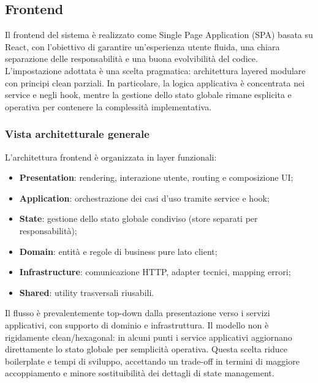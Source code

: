 \documentclass[a4paper,12pt]{article}
\begin{document}
        \subsection{Frontend}
            Il frontend del sistema è realizzato come Single Page Application (SPA) basata su React, con l'obiettivo di garantire un'esperienza utente fluida, una chiara separazione delle responsabilità e una buona evolvibilità del codice.  
            L'impostazione adottata è una scelta pragmatica: architettura layered modulare con principi clean parziali. In particolare, la logica applicativa è concentrata nei service e negli hook, mentre la gestione dello stato globale rimane esplicita e operativa per contenere la complessità implementativa.
            
            \subsubsection{Vista architetturale generale}
            L'architettura frontend è organizzata in layer funzionali:
            \begin{itemize}
                \item \textbf{Presentation}: rendering, interazione utente, routing e composizione UI;
                \item \textbf{Application}: orchestrazione dei casi d'uso tramite service e hook;
                \item \textbf{State}: gestione dello stato globale condiviso (store separati per responsabilità);
                \item \textbf{Domain}: entità e regole di business pure lato client;
                \item \textbf{Infrastructure}: comunicazione HTTP, adapter tecnici, mapping errori;
                \item \textbf{Shared}: utility trasversali riusabili.
            \end{itemize}
            
            Il flusso è prevalentemente top-down dalla presentazione verso i servizi applicativi, con supporto di dominio e infrastruttura.  
            Il modello non è rigidamente clean/hexagonal: in alcuni punti i service applicativi aggiornano direttamente lo stato globale per semplicità operativa. Questa scelta riduce boilerplate e tempi di sviluppo, accettando un trade-off in termini di maggiore accoppiamento e minore sostituibilità dei dettagli di state management.
            
\end{document}
